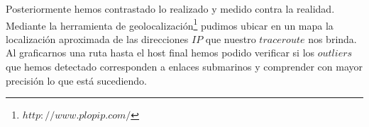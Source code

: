Posteriormente hemos contrastado lo realizado y medido contra la realidad. 
Mediante la herramienta de geolocalización\footnote{$http://www.plopip.com/$} 
pudimos ubicar en un mapa la localización aproximada de las direcciones $IP$ que nuestro $traceroute$ nos brinda. 
Al graficarnos una ruta hasta el host final hemos podido verificar si los $outliers$ que hemos detectado corresponden a 
enlaces submarinos y comprender con mayor precisión lo que está sucediendo.
